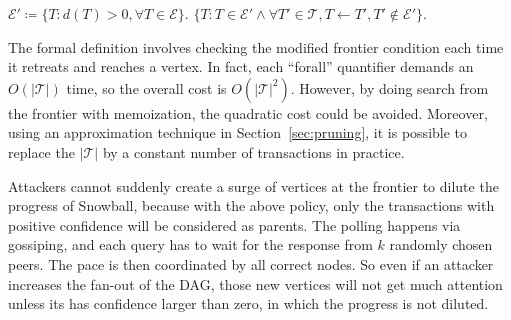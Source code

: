 \begin{center}
\begin{algorithmic}[1]
    \small
        \State $\mathcal{E}' \coloneqq \{T: d(T) > 0, \forall T\in\mathcal{E}\}$.
        \State \Return $\{T: T \in \mathcal{E}' \land \forall T'\in\mathcal{T}, T \gets T', T' \notin \mathcal{E}'\}$.
    \EndFunction
    \label{fig:gossipchain-parent}
\end{algorithmic}
\end{center}
The formal definition involves checking the modified frontier condition each
time it retreats and reaches a vertex. In fact, each ``forall'' quantifier
demands an $O(|\mathcal{T}|)$ time, so the overall cost is
$O(|\mathcal{T}|^2)$. However, by doing search from the frontier with
memoization, the quadratic cost could be avoided. Moreover, using an
approximation technique in Section~\ref{sec:pruning}, it is possible to replace the
$|\mathcal{T}|$ by a constant number of transactions in practice.

Attackers cannot suddenly create a surge of vertices at the frontier to dilute
the progress of Snowball, because with the above policy, only the transactions
with positive confidence will be considered as parents. The polling happens via
gossiping, and each query has to wait for the response from $k$ randomly chosen
peers. The pace is then coordinated by all correct nodes. So even if an
attacker increases the fan-out of the DAG, those new vertices will not
get much attention unless its has confidence larger than zero, in which the
progress is not diluted.
